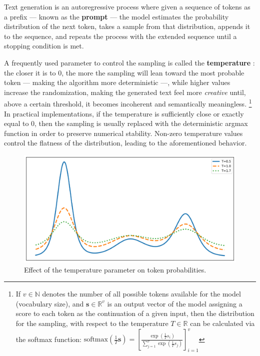 \documentclass[noindent,nohyp,parspace,titlepage,twoside,12pt]{article}
\begin{document}
      Text generation is an autoregressive process where given a
      sequence of tokens as a prefix --- known as the \textbf{prompt} --- the
      model estimates the probability distribution of the next token, takes a
      sample from that distribution, appends it to the sequence, and repeats
      the process with the extended sequence until a stopping condition is met.

      A frequently used parameter to control the sampling is called the
      \textbf{temperature} \cite{temperature}: the closer it is to 0, the more
      the sampling will lean toward the most probable token --- making the
      algorithm more deterministic ---, while higher values increase the
      randomization, making the generated text feel more \emph{creative} until,
      above a certain threshold, it becomes incoherent and semantically
      meaningless. \footnote{If $v \in \mathbb{N}$ denotes the number of all
      possible tokens available for the model (vocabulary size), and
      $\mathbf{s} \in \mathbb{R}^v$ is an output vector of the model assigning
      a score to each token as the continuation of a given input, then the
      distribution for the sampling, with respect to the temperature $T \in
      \mathbb{R}$ can be calculated via the softmax function:
      $\text{softmax}\left(\frac{1}{T} \mathbf{s}\right) = \left[
      \frac{\exp(\frac{1}{T} s_i)}{\sum_{j=1}^v \exp(\frac{1}{T} s_j)}
      \right]_{i=1}^v$} In practical implementations, if the temperature is
      sufficiently close or exactly equal to $0$, then the sampling is usually
      replaced with the deterministic argmax function in order to preserve
      numerical stability. Non-zero temperature values control the flatness of
      the distribution, leading to the aforementioned behavior.

      \begin{figure}[hbtp]
        \label{figtemperature}
        \includegraphics[width=\textwidth]{softmax-temperature}
        \caption{Effect of the temperature parameter on token probabilities.}
      \end{figure}
\end{document}
